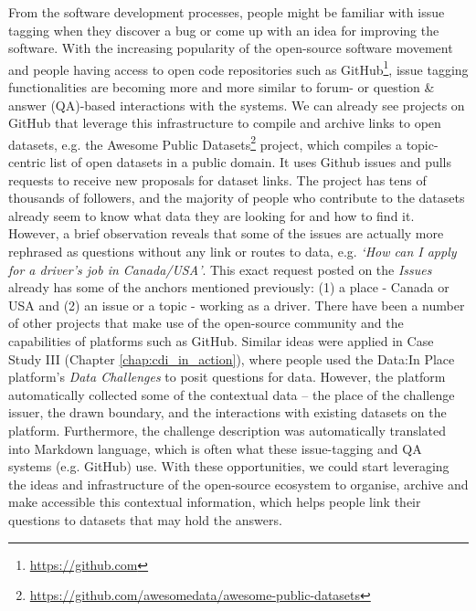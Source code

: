 From the software development processes, people might be familiar with issue tagging when they discover a bug or come up with an idea for improving the software. With the increasing popularity of the open-source software movement and people having access to open code repositories such as GitHub\footnote{\url{https://github.com}}, issue tagging functionalities are becoming more and more similar to forum- or question \& answer (QA)-based interactions with the systems. We can already see projects on GitHub that leverage this infrastructure to compile and archive links to open datasets, e.g. the Awesome Public Datasets\footnote{\url{https://github.com/awesomedata/awesome-public-datasets}} project, which compiles a topic-centric list of open datasets in a public domain. It uses Github issues and pulls requests to receive new proposals for dataset links. The project has tens of thousands of followers, and the majority of people who contribute to the datasets already seem to know what data they are looking for and how to find it. However, a brief observation reveals that some of the issues are actually more rephrased as questions without any link or routes to data, e.g. \textit{`How can I apply for a driver's job in Canada/USA'}. This exact request posted on the \textit{Issues} already has some of the anchors mentioned previously: (1) a place - Canada or USA and (2) an issue or a topic - working as a driver. There have been a number of other projects that make use of the open-source community and the capabilities of platforms such as GitHub. Similar ideas were applied in Case Study III (Chapter \ref{chap:cdi_in_action}), where people used the Data:In Place platform's \textit{Data Challenges} to posit questions for data. However, the platform automatically collected some of the contextual data -- the place of the challenge issuer, the drawn boundary, and the interactions with existing datasets on the platform. Furthermore, the challenge description was automatically translated into Markdown language, which is often what these issue-tagging and QA systems (e.g. GitHub) use. With these opportunities, we could start leveraging the ideas and infrastructure of the open-source ecosystem to organise, archive and make accessible this contextual information, which helps people link their questions to datasets that may hold the answers.

